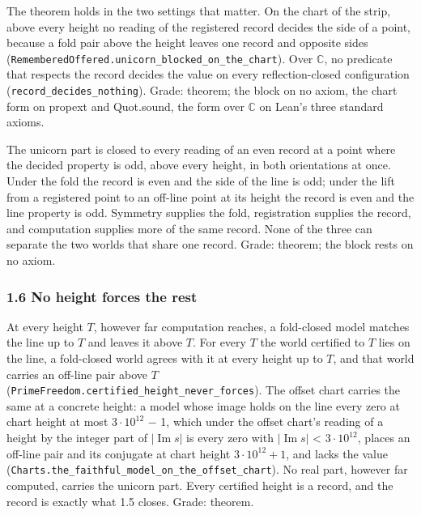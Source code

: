 \documentclass[10pt]{article}
\newenvironment{jbox}[2]{\par\vspace{7pt}\noindent{\color{accent}\rule{\linewidth}{0.8pt}}\par\nopagebreak[4]\vspace{1pt}%
  \noindent{\small\bfseries{\color{accent}Box #1}\enspace\textbar\enspace{\color{deep}#2}}\par\nopagebreak[4]\vspace{2pt}\small\setlength{\parindent}{0pt}\setlength{\parskip}{3pt}}%
  {\par\vspace{2pt}\noindent{\color{accent!45}\rule{\linewidth}{0.4pt}}\par\vspace{7pt}}
\begin{document}
The theorem holds in the two settings that matter. On the chart of the
strip, above every height no reading of the registered record decides
the side of a point, because a fold pair above the height leaves one
record and opposite sides
(\texttt{RememberedOffered.\allowbreak{}unicorn\_\allowbreak{}blocked\_\allowbreak{}on\_\allowbreak{}the\_\allowbreak{}chart}).
Over \(\mathbb{C}\), no predicate that respects the record decides the
value on every reflection-closed configuration
(\texttt{record\_\allowbreak{}decides\_\allowbreak{}nothing}). Grade:
theorem; the block on no axiom, the chart form on propext and
Quot.sound, the form over \(\mathbb{C}\) on Lean's three standard
axioms.

\begin{jbox}{1}{The unicorn part, closed}

The unicorn part is closed to every reading of an even record at a point
where the decided property is odd, above every height, in both
orientations at once. Under the fold the record is even and the side of
the line is odd; under the lift from a registered point to an off-line
point at its height the record is even and the line property is odd.
Symmetry supplies the fold, registration supplies the record, and
computation supplies more of the same record. None of the three can
separate the two worlds that share one record. Grade: theorem; the block
rests on no axiom.

\end{jbox}

\hypertarget{no-height-forces-the-rest}{%
\subsubsection{1.6 No height forces the
rest}\label{no-height-forces-the-rest}}

At every height \(T\), however far computation reaches, a fold-closed
model matches the line up to \(T\) and leaves it above \(T\). For every
\(T\) the world certified to \(T\) lies on the line, a fold-closed world
agrees with it at every height up to \(T\), and that world carries an
off-line pair above \(T\)
(\texttt{PrimeFreedom.\allowbreak{}certified\_\allowbreak{}height\_\allowbreak{}never\_\allowbreak{}forces}).
The offset chart carries the same at a concrete height: a model whose
image holds on the line every zero at chart height at most
\(3\cdot 10^{12}\) − 1, which under the offset chart's reading of a
height by the integer part of \(|\operatorname{Im} s|\) is every zero
with \(|\operatorname{Im} s|\) \textless{} \(3\cdot 10^{12}\), places an
off-line pair and its conjugate at chart height \(3\cdot 10^{12} + 1\),
and lacks the value
(\texttt{Charts.\allowbreak{}the\_\allowbreak{}faithful\_\allowbreak{}model\_\allowbreak{}on\_\allowbreak{}the\_\allowbreak{}offset\_\allowbreak{}chart}).
No real part, however far computed, carries the unicorn part. Every
certified height is a record, and the record is exactly what 1.5 closes.
Grade: theorem.
\end{document}
